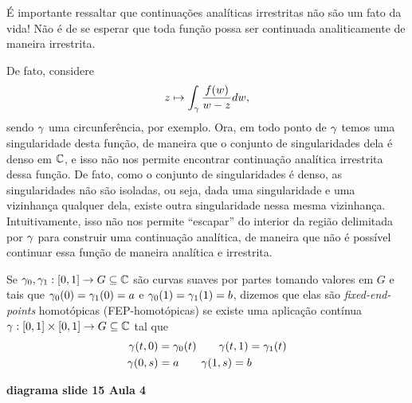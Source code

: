     \begin{observacao}
        É importante ressaltar que continuações analíticas irrestritas não são um fato da vida!
        Não é de se esperar que toda função possa ser continuada analiticamente de maneira
        irrestrita.
        
        De fato, considere
        \begin{equation*}
            z\mapsto \int_{\gamma} \frac{f(w)}{w-z}dw,
        \end{equation*}
        sendo $\gamma$ uma circunferência, por exemplo. Ora, em todo ponto de $\gamma$
        temos uma singularidade desta função, de maneira que o conjunto de singularidades
        dela é denso em $\mathbb{C}$, e isso não nos permite encontrar continuação analítica 
        irrestrita dessa função. De fato, como o conjunto de singularidades é denso, as 
        singularidades não são isoladas, ou seja, dada uma singularidade e uma vizinhança
        qualquer dela, existe outra singularidade nessa mesma vizinhança. Intuitivamente, 
        isso não nos permite ``escapar'' do interior da região delimitada por $\gamma$ para
        construir uma continuação analítica, de maneira que não é possível continuar 
        essa função de maneira analítica e irrestrita.
    \end{observacao}

    \begin{definicao}
    \label{def-fep-homotopicas}
        Se $\gamma_0, \gamma_1 :[0,1]\to G\subseteq\mathbb{C}$ são curvas 
        suaves por partes tomando valores em $G$ e tais que 
        $\gamma_0(0) = \gamma_1(0) = a$ e $\gamma_0(1) = \gamma_1(1) = b$, 
        dizemos que elas são \textit{fixed-end-points}
        homotópicas (FEP-homotópicas) se existe uma aplicação contínua 
        $\gamma:[0,1]\times [0,1] \to G\subseteq\mathbb{C}$ tal que
        \begin{align*}
            \gamma(t,0) &= \gamma_0(t) \qquad \gamma(t,1) = \gamma_1(t) \\
            \gamma(0,s) &= a \qquad \gamma(1,s) = b
        \end{align*}
        \begin{center}
            \textbf{diagrama slide 15 Aula 4}
        \end{center}
    \end{definicao}

